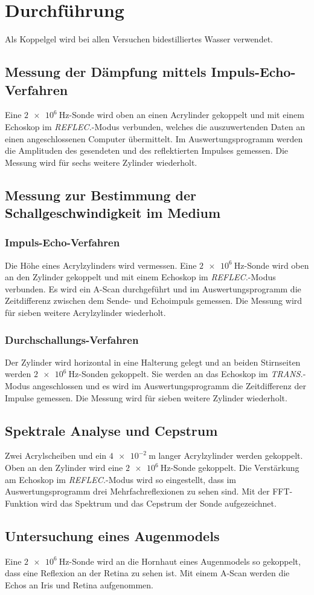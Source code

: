 \section{Durchführung}
\label{sec:Durchführung}

Als Koppelgel wird bei allen Versuchen bidestilliertes Wasser verwendet.

\subsection{Messung der Dämpfung mittels Impuls-Echo-Verfahren}
Eine $\SI{2e6}{\hertz}$-Sonde wird oben an einen Acrylinder gekoppelt und mit einem Echoskop im \textit{REFLEC.}-Modus verbunden, welches die auszuwertenden Daten an einen angeschlossenen Computer übermittelt.
Im Auswertungsprogramm werden die Amplituden des gesendeten und des reflektierten Impulses gemessen. 
Die Messung wird für sechs weitere Zylinder wiederholt.

\subsection{Messung zur Bestimmung der Schallgeschwindigkeit im Medium}
\subsubsection{Impuls-Echo-Verfahren}
Die Höhe eines Acrylzylinders wird vermessen. Eine $\SI{2e6}{\hertz}$-Sonde wird oben an den Zylinder gekoppelt und mit einem Echoskop im \textit{REFLEC.}-Modus verbunden.
Es wird ein A-Scan durchgeführt und im Auswertungsprogramm die Zeitdifferenz zwischen dem Sende- und Echoimpuls gemessen.
Die Messung wird für sieben weitere Acrylzylinder wiederholt.

\subsubsection{Durchschallungs-Verfahren}
Der Zylinder wird horizontal in eine Halterung gelegt und an beiden Stirnseiten werden $\SI{2e6}{\hertz}$-Sonden gekoppelt. Sie werden an das Echoskop im \textit{TRANS.}-Modus angeschlossen und es wird im Auswertungsprogramm die Zeitdifferenz der Impulse gemessen.
Die Messung wird für sieben weitere Zylinder wiederholt.

\subsection{Spektrale Analyse und Cepstrum}
Zwei Acrylscheiben und ein $\SI{4e-2}{\metre}$ langer Acrylzylinder werden gekoppelt. Oben an den Zylinder wird eine $\SI{2e6}{\hertz}$-Sonde gekoppelt.
Die Verstärkung am Echoskop im \textit{REFLEC.}-Modus wird so eingestellt, dass im Auswertungsprogramm drei Mehrfachreflexionen zu sehen sind. Mit der FFT-Funktion wird das Spektrum und das Cepstrum der Sonde aufgezeichnet.

\subsection{Untersuchung eines Augenmodels}
Eine $\SI{2e6}{\hertz}$-Sonde wird an die Hornhaut eines Augenmodels so gekoppelt, dass eine Reflexion an der Retina zu sehen ist. Mit einem A-Scan werden die Echos an Iris und Retina aufgenommen.